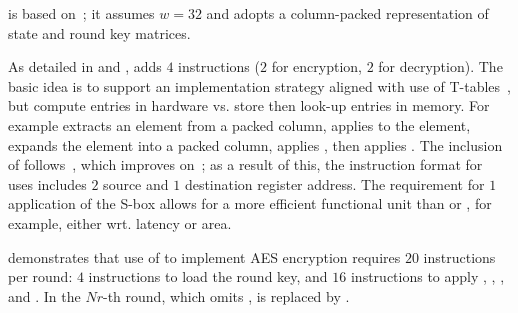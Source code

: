 
is based on~\cite{NadIkeKur:04,BBFR:06,Saarinen:20}; it
assumes 
$w = 32$
and adopts a 
column-packed 
representation of state and round key matrices.

As detailed in
and
,
adds
$ 4$
instructions ($2$ for encryption, $2$ for decryption).
The basic idea is to support an implementation strategy aligned with use
of 
T-tables~\cite[Section 4.2]{DaeRij:02}, 
but compute entries in hardware vs. store then look-up entries in memory.
For example
extracts                     an     element from a packed column,
 applies   to the element,
 expands                        the element into a packed column,
 applies ,
then
 applies .
The inclusion of  follows~\cite{Saarinen:20}, which
improves on~\cite{NadIkeKur:04,BBFR:06}; as a result of this,
the instruction format for
uses 
includes $2$ source and $1$ destination register address.
The requirement for $1$ application of the S-box allows for a more efficient 
functional unit than  or , for example, either wrt. latency or 
area.

demonstrates that use of  to implement AES encryption requires
$20$ instructions per round:
$ 4$            
     instructions to load the round key,
and
$16$  
     instructions to apply , , , and .
In the $Nr$-th round, which omits ,
is replaced by 
     .

